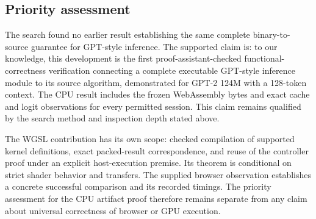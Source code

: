 \subsection{Priority assessment}

The search found no earlier result establishing the same complete binary-to-source guarantee for GPT-style inference.  The supported claim is: to our knowledge, this development is the first proof-assistant-checked functional-correctness verification connecting a complete executable GPT-style inference module to its source algorithm, demonstrated for GPT-2 124M with a 128-token context.  The CPU result includes the frozen WebAssembly bytes and exact cache and logit observations for every permitted session.  This claim remains qualified by the search method and inspection depth stated above.

The WGSL contribution has its own scope: checked compilation of supported kernel definitions, exact packed-result correspondence, and reuse of the controller proof under an explicit host-execution premise.  Its theorem is conditional on strict shader behavior and transfers.  The supplied browser observation establishes a concrete successful comparison and its recorded timings.  The priority assessment for the CPU artifact proof therefore remains separate from any claim about universal correctness of browser or GPU execution.
